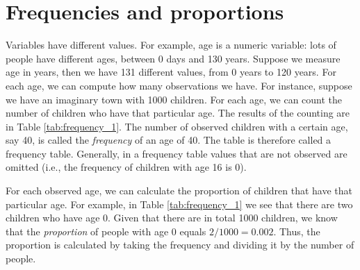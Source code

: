 \documentclass[]{report}\usepackage[]{graphicx}\usepackage[]{color}
\begin{document}
\section{Frequencies and proportions}

Variables have different values. For example, age is a numeric variable: lots of people have different ages, between 0 days and 130 years. Suppose we measure age in years, then we have 131 different values, from 0 years to 120 years. For each age, we can compute how many observations we have. For instance, suppose we have an imaginary town with 1000 children. For each age, we can count the number of children who have that particular age. The results of the counting are in Table \ref{tab:frequency_1}. The number of observed children with a certain age, say 40, is called the \textit{frequency} of an age of 40. The table is therefore called a frequency table. Generally, in a frequency table values that are not observed are omitted (i.e., the frequency of children with age 16 is 0).

For each observed age, we can calculate the proportion of children that have that particular age. For example, in Table \ref{tab:frequency_1} we see that there are two children who have age 0. Given that there are in total 1000 children, we know that the \textit{proportion} of people with age 0 equals $2/1000=0.002$. Thus, the proportion is calculated by taking the frequency and dividing it by the number of people.
\end{document}

